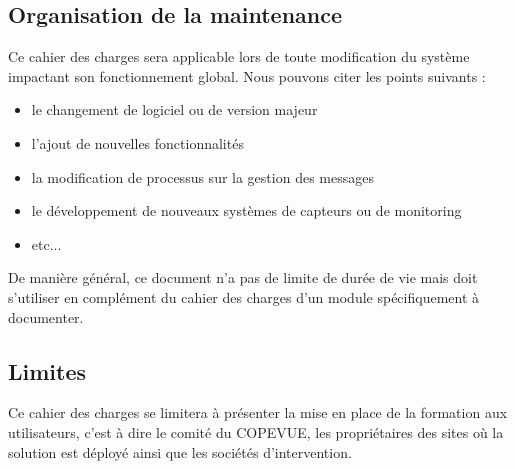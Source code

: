 

\subsection{Organisation de la maintenance}

Ce cahier des charges sera applicable lors de toute modification du système 
impactant son fonctionnement global. Nous pouvons citer les points suivants :
\begin{itemize}
	\item le changement de logiciel ou de version majeur
	\item l'ajout de nouvelles fonctionnalités
	\item la modification de processus sur la gestion des messages
	\item le développement de nouveaux systèmes de capteurs ou de monitoring
	\item etc...
\end{itemize}

De manière général, ce document n'a pas de limite de durée de vie mais doit s'utiliser
en complément du cahier des charges d'un module spécifiquement à documenter.

\subsection{Limites}

Ce cahier des charges se limitera à présenter la mise en place de la formation 
aux utilisateurs, c'est à dire le comité du COPEVUE, les propriétaires des sites
où la solution est déployé ainsi que les sociétés d'intervention.

\vfill
\pagebreak
